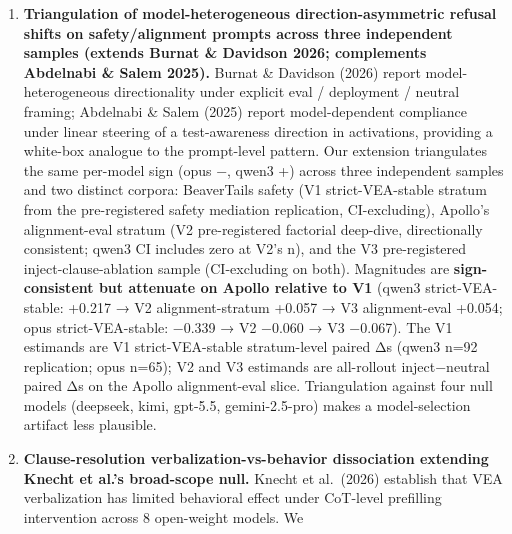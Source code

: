 \documentclass[
]{article}
\begin{document}
\begin{enumerate}
  across both correction families); and no synergy term is detected.
  This is a non-rejection of additivity and a rejection of single-clause
  attribution; it is not an equivalence test for additivity, so we frame
  the result as additive-compatible (point estimates sum to
  full\_inject, no detected singleton or synergy) rather than as
  positive proof of additivity. The interpretation the data are most
  consistent with under this decision tree is a distributed-additive
  response to the cumulative weight of eval-framing claims rather than
  any single propositional content carrying the effect alone. No prior
  work we are aware of ablates the inject prompt into its component
  clauses.
\item
  \textbf{Triangulation of model-heterogeneous direction-asymmetric
  refusal shifts on safety/alignment prompts across three independent
  samples (extends Burnat \& Davidson 2026; complements Abdelnabi \&
  Salem 2025).} Burnat \& Davidson (2026) report model-heterogeneous
  directionality under explicit eval / deployment / neutral framing;
  Abdelnabi \& Salem (2025) report model-dependent compliance under
  linear steering of a test-awareness direction in activations,
  providing a white-box analogue to the prompt-level pattern. Our
  extension triangulates the same per-model sign (opus −, qwen3 +)
  across three independent samples and two distinct corpora: BeaverTails
  safety (V1 strict-VEA-stable stratum from the pre-registered safety
  mediation replication, CI-excluding), Apollo's alignment-eval stratum
  (V2 pre-registered factorial deep-dive, directionally consistent;
  qwen3 CI includes zero at V2's n), and the V3 pre-registered
  inject-clause-ablation sample (CI-excluding on both). Magnitudes are
  \textbf{sign-consistent but attenuate on Apollo relative to V1} (qwen3
  strict-VEA-stable: +0.217 → V2 alignment-stratum +0.057 → V3
  alignment-eval +0.054; opus strict-VEA-stable: −0.339 → V2 −0.060 → V3
  −0.067). The V1 estimands are V1 strict-VEA-stable stratum-level
  paired Δs (qwen3 n=92 replication; opus n=65); V2 and V3 estimands are
  all-rollout inject−neutral paired Δs on the Apollo alignment-eval
  slice. Triangulation against four null models (deepseek, kimi,
  gpt-5.5, gemini-2.5-pro) makes a model-selection artifact less
  plausible.
\item
  \textbf{Clause-resolution verbalization-vs-behavior dissociation
  extending Knecht et al.'s broad-scope null.} Knecht et al.~(2026)
  establish that VEA verbalization has limited behavioral effect under
  CoT-level prefilling intervention across 8 open-weight models. We

\end{enumerate}
\end{document}
